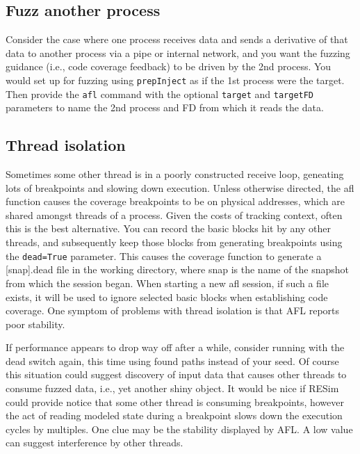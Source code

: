 \documentclass[titlepage]{article}
\begin{document}
\subsection{Fuzz another process}
Consider the case where one process receives data and sends a derivative of that data to another process via a pipe or internal network,
and you want the fuzzing guidance (i.e., code coverage feedback) to be driven by the 2nd process.  You would set up for fuzzing using
{\tt prepInject} as if the 1st process were the target.  Then provide the {\tt afl} command with the optional {\tt target} and {\tt targetFD}
parameters to name the 2nd process and FD from which it reads the data.

\subsection{Thread isolation}
Sometimes some other thread is in a poorly constructed receive loop, geneating lots of breakpoints and slowing down execution.
Unless otherwise directed, the afl function causes the coverage breakpoints to be on physical addresses, which are shared amongst threads of a process.  Given the costs
of tracking context, often this is the best alternative.  You can record the basic blocks hit by any other threads, and subsequently keep those blocks from generating
breakpoints using the {\tt dead=True} parameter.  This causes the coverage function to generate a [snap].dead file in the working directory, where snap is the
name of the snapshot from which the session began.  When starting a new afl session, if such a file exists, it will be used to ignore selected basic blocks
when establishing code coverage.  One symptom of problems with thread isolation is that AFL reports poor stability.

If performance appears to drop way off after a while, consider running with the dead switch again, this time using found paths instead of your seed.  Of course
this situation could suggest discovery of input data that causes other threads to consume fuzzed data, i.e., yet another shiny object.
It would be nice if RESim could provide notice that some other thread is consuming breakpoints, however the act of reading modeled state during a 
breakpoint slows down the execution cycles by multiples.  One clue may be the stability displayed by AFL.  A low value can suggest interference by other threads.
\end{document}
